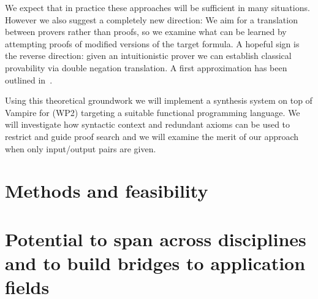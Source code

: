\documentclass[a4paper,12pt]{article}
\begin{document}
	We expect that in practice these approaches will be sufficient in many situations. However we also suggest a completely new direction: We aim for a translation between provers rather than proofs, so we examine what can be learned by attempting proofs of modified versions of the target formula. A hopeful sign is the reverse direction: given an intuitionistic prover we can establish classical provability via double negation translation. A first approximation has been outlined in~\cite{RDNT}.
	
	Using this theoretical groundwork we will implement a synthesis system on top of Vampire for (WP2) targeting a suitable functional programming language. We will investigate how syntactic context and redundant
	axioms can be used to restrict and guide proof search and we will examine the merit of our approach when only input/output pairs are given.
	
	

	\section{Methods and feasibility}
	
	\section{Potential to span across disciplines and to build bridges to application fields}
	
	
	
	
\end{document}
